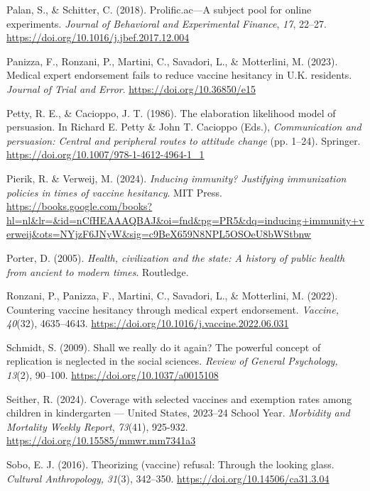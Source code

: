 \documentclass[authordate, reflection,issue]{jote-new-article}
\begin{document}
	Palan, S., \& Schitter, C. (2018). Prolific.ac—A subject pool for online experiments. \emph{Journal of Behavioral and Experimental Finance}, \emph{17}, 22--27. \url{https://doi.org/10.1016/j.jbef.2017.12.004}



	Panizza, F., Ronzani, P., Martini, C., Savadori, L., \& Motterlini, M. (2023). Medical expert endorsement fails to reduce vaccine hesitancy in U.K. residents. \emph{Journal of Trial and Error}. \url{https://doi.org/10.36850/e15}



	Petty, R. E., \& Cacioppo, J. T. (1986). The elaboration likelihood model of persuasion. In Richard E. Petty \& John T. Cacioppo (Eds.), \emph{Communication and persuasion: Central and peripheral routes to attitude change }(pp. 1--24). Springer. \url{https://doi.org/10.1007/978-1-4612-4964-1\_1}



	Pierik, R. \& Verweij, M. (2024). \emph{Inducing immunity? Justifying immunization policies in times of vaccine hesitancy}. MIT Press. \url{https://books.google.com/books?hl=nl\&lr=\&id=nCfHEAAAQBAJ\&oi=fnd\&pg=PR5\&dq=inducing+immunity+verweij\&ots=NYjzF6JNyW\&sig=c9BeX659N8NPL5OSOeU8bWStbnw}



	Porter, D. (2005). \emph{Health, civilization and the state: A history of public health from ancient to modern times}. Routledge.



	Ronzani, P., Panizza, F., Martini, C., Savadori, L., \& Motterlini, M. (2022). Countering vaccine hesitancy through medical expert endorsement. \emph{Vaccine,} \emph{40}(32), 4635--4643. \url{https://doi.org/10.1016/j.vaccine.2022.06.031}



	Schmidt, S. (2009). Shall we really do it again? The powerful concept of replication is neglected in the social sciences. \emph{Review of General Psychology,} \emph{13}(2), 90--100. \url{https://doi.org/10.1037/a0015108}



	Seither, R. (2024). Coverage with selected vaccines and exemption rates among children in kindergarten — United States, 2023--24 School Year. \emph{Morbidity and Mortality Weekly Report},\emph{ 73}(41), 925-932. \url{https://doi.org/10.15585/mmwr.mm7341a3}



	Sobo, E. J. (2016). Theorizing (vaccine) refusal: Through the looking glass. \emph{Cultural Anthropology,} \emph{31}(3), 342--350. \url{https://doi.org/10.14506/ca31.3.04}
\end{document}
